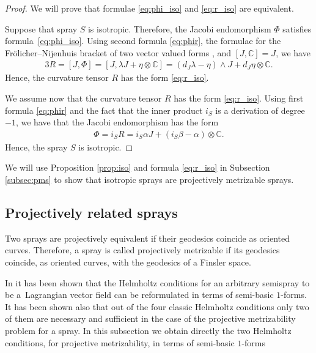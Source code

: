 \begin{proof}
We will prove that formulae \eqref{eq:phi_iso} and \eqref{eq:r_iso}
are equivalent.

Suppose that spray $S$ is isotropic. Therefore, the Jacobi endomorphism
$\Phi$ satisf\/ies formu\-la~\eqref{eq:phi_iso}. Using second formula
\eqref{eq:phir}, the formulae for the Fr\"olicher--Nijenhuis bracket of
two vector valued forms \cite[Appendix~A1]{grifone00}, and $[J, \mathbb{C}]=J$, we have
\begin{gather*}
3R=[J,\Phi]=[J, \lambda J + \eta\otimes \mathbb{C}] =
\left(d_J\lambda-\eta\right)\wedge J + d_J\eta \otimes \mathbb{C}. %
\end{gather*} Hence, the curvature tensor $R$ has the form
\eqref{eq:r_iso}.

We assume now that the curvature tensor $R$ has the form
\eqref{eq:r_iso}.  Using f\/irst formula \eqref{eq:phir} and the fact
that the inner product $i_S$ is a derivation of degree $-1$, we have
that the Jacobi endomorphism has the form
\begin{gather*}
\Phi=i_SR=i_S\alpha J + \left(i_S\beta-\alpha\right)\otimes
\mathbb{C}. %
\end{gather*} Hence, the spray $S$ is isotropic.
\end{proof}

We will use  Proposition \ref{prop:iso} and formula \eqref{eq:r_iso} in
Subsection \ref{subsec:pms} to show that isotropic sprays are
projectively metrizable sprays.


\subsection{Projectively related sprays} \label{subsec:prs}

Two sprays are projectively equivalent if their geodesics
coincide as oriented curves. Therefore, a spray is called projectively
metrizable if its geodesics coincide, as oriented curves, with the
geodesics of a Finsler space.

In \cite{bucataru09} it has been shown that the Helmholtz conditions for an
arbitrary semispray to be a~Lag\-rangian vector f\/ield can be
reformulated in terms of semi-basic $1$-forms. It has been shown also
that out of the four classic Helmholtz conditions only two of them are necessary and suf\/f\/icient
in the case of the projective metrizability problem for a spray. In this
subsection we obtain directly the two Helmholtz conditions, for
projective metrizability, in terms of semi-basic $1$-forms

